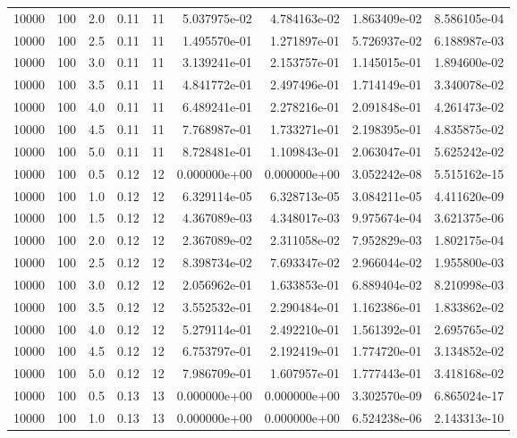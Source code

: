 \begin{tabular}{rrrrrrrrr}
 10000 &  100 &  2.0 &  0.11 &    11 &  5.037975e-02 &  4.784163e-02 &  1.863409e-02 &  8.586105e-04 \\
 10000 &  100 &  2.5 &  0.11 &    11 &  1.495570e-01 &  1.271897e-01 &  5.726937e-02 &  6.188987e-03 \\
 10000 &  100 &  3.0 &  0.11 &    11 &  3.139241e-01 &  2.153757e-01 &  1.145015e-01 &  1.894600e-02 \\
 10000 &  100 &  3.5 &  0.11 &    11 &  4.841772e-01 &  2.497496e-01 &  1.714149e-01 &  3.340078e-02 \\
 10000 &  100 &  4.0 &  0.11 &    11 &  6.489241e-01 &  2.278216e-01 &  2.091848e-01 &  4.261473e-02 \\
 10000 &  100 &  4.5 &  0.11 &    11 &  7.768987e-01 &  1.733271e-01 &  2.198395e-01 &  4.835875e-02 \\
 10000 &  100 &  5.0 &  0.11 &    11 &  8.728481e-01 &  1.109843e-01 &  2.063047e-01 &  5.625242e-02 \\
 10000 &  100 &  0.5 &  0.12 &    12 &  0.000000e+00 &  0.000000e+00 &  3.052242e-08 &  5.515162e-15 \\
 10000 &  100 &  1.0 &  0.12 &    12 &  6.329114e-05 &  6.328713e-05 &  3.084211e-05 &  4.411620e-09 \\
 10000 &  100 &  1.5 &  0.12 &    12 &  4.367089e-03 &  4.348017e-03 &  9.975674e-04 &  3.621375e-06 \\
 10000 &  100 &  2.0 &  0.12 &    12 &  2.367089e-02 &  2.311058e-02 &  7.952829e-03 &  1.802175e-04 \\
 10000 &  100 &  2.5 &  0.12 &    12 &  8.398734e-02 &  7.693347e-02 &  2.966044e-02 &  1.955800e-03 \\
 10000 &  100 &  3.0 &  0.12 &    12 &  2.056962e-01 &  1.633853e-01 &  6.889404e-02 &  8.210998e-03 \\
 10000 &  100 &  3.5 &  0.12 &    12 &  3.552532e-01 &  2.290484e-01 &  1.162386e-01 &  1.833862e-02 \\
 10000 &  100 &  4.0 &  0.12 &    12 &  5.279114e-01 &  2.492210e-01 &  1.561392e-01 &  2.695765e-02 \\
 10000 &  100 &  4.5 &  0.12 &    12 &  6.753797e-01 &  2.192419e-01 &  1.774720e-01 &  3.134852e-02 \\
 10000 &  100 &  5.0 &  0.12 &    12 &  7.986709e-01 &  1.607957e-01 &  1.777443e-01 &  3.418168e-02 \\
 10000 &  100 &  0.5 &  0.13 &    13 &  0.000000e+00 &  0.000000e+00 &  3.302570e-09 &  6.865024e-17 \\
 10000 &  100 &  1.0 &  0.13 &    13 &  0.000000e+00 &  0.000000e+00 &  6.524238e-06 &  2.143313e-10 \\

\end{tabular}
